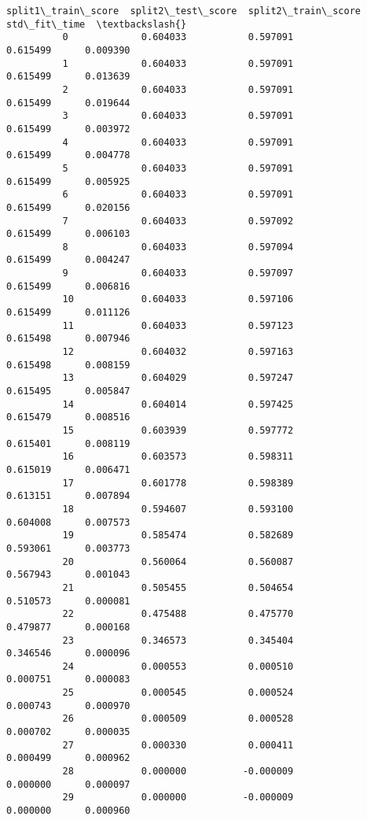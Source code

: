 \documentclass[11pt]{article}
\begin{document}
\begin{Verbatim}[commandchars=\\\{\}]
              split1\_train\_score  split2\_test\_score  split2\_train\_score  std\_fit\_time  \textbackslash{}
          0             0.604033           0.597091            0.615499      0.009390   
          1             0.604033           0.597091            0.615499      0.013639   
          2             0.604033           0.597091            0.615499      0.019644   
          3             0.604033           0.597091            0.615499      0.003972   
          4             0.604033           0.597091            0.615499      0.004778   
          5             0.604033           0.597091            0.615499      0.005925   
          6             0.604033           0.597091            0.615499      0.020156   
          7             0.604033           0.597092            0.615499      0.006103   
          8             0.604033           0.597094            0.615499      0.004247   
          9             0.604033           0.597097            0.615499      0.006816   
          10            0.604033           0.597106            0.615499      0.011126   
          11            0.604033           0.597123            0.615498      0.007946   
          12            0.604032           0.597163            0.615498      0.008159   
          13            0.604029           0.597247            0.615495      0.005847   
          14            0.604014           0.597425            0.615479      0.008516   
          15            0.603939           0.597772            0.615401      0.008119   
          16            0.603573           0.598311            0.615019      0.006471   
          17            0.601778           0.598389            0.613151      0.007894   
          18            0.594607           0.593100            0.604008      0.007573   
          19            0.585474           0.582689            0.593061      0.003773   
          20            0.560064           0.560087            0.567943      0.001043   
          21            0.505455           0.504654            0.510573      0.000081   
          22            0.475488           0.475770            0.479877      0.000168   
          23            0.346573           0.345404            0.346546      0.000096   
          24            0.000553           0.000510            0.000751      0.000083   
          25            0.000545           0.000524            0.000743      0.000970   
          26            0.000509           0.000528            0.000702      0.000035   
          27            0.000330           0.000411            0.000499      0.000962   
          28            0.000000          -0.000009            0.000000      0.000097   
          29            0.000000          -0.000009            0.000000      0.000960   
          

\end{Verbatim}
\end{document}
